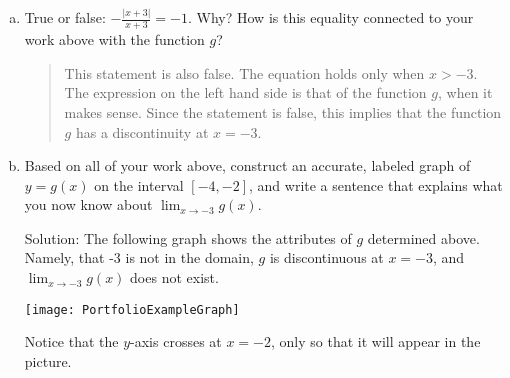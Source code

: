 \begin{enumerate}[(a)]
\item  True or false: $-\frac{|x+3|}{x+3} = -1$.  Why?  How is this equality connected to your work above with the function $g$?

\begin{quote}
{\color{blue}
This statement is also false.  The equation holds only when $x > -3$.  The expression on the left hand side is that of the function $g$, when it makes sense.  Since the statement is false, this implies that the function $g$ has a discontinuity at $x = -3$.
}
\end{quote}

\vfill

\newpage

\item  Based on all of your work above, construct an accurate, labeled graph of $y = g(x)$ on the interval $[-4, -2]$, and write a sentence that explains what you now know about $\displaystyle{\lim_{x \rightarrow -3} g(x)}$.

{\color{blue}
Solution:  The following graph shows the attributes of $g$ determined above.  Namely, that -3 is not in the domain, $g$ is discontinuous at $x = -3$, and $\displaystyle{\lim_{x \rightarrow -3} g(x)}$ does not exist.

\begin{center} %
\texttt{[image: PortfolioExampleGraph]}
\end{center}
}
Notice that the $y$-axis crosses at $x = -2$, only so that it will appear in the picture.


\end{enumerate}


